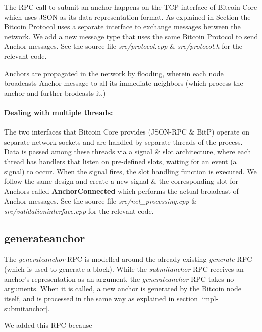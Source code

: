 The RPC call to submit an anchor happens on the TCP interface of Bitcoin Core which uses JSON as its data representation format. As explained in Section  the Bitcoin Protocol uses a separate interface to exchange messages between the network. 
We add a new message type that uses the same Bitcoin Protocol to send Anchor messages. 
See the source file \textit{src/protocol.cpp} \& \textit{src/protocol.h} for the relevant code.

Anchors are propagated in the network by flooding, wherein each node broadcasts Anchor message to all its immediate neighbors (which process the anchor and further brodcasts it.)


\paragraph{Dealing with multiple threads:} 
The two interfaces that Bitcoin Core provides (JSON-RPC \& BitP) operate on separate network sockets and are handled by separate threads of the process. 
Data is passed among these threads via a signal \& slot architecture, where each thread has handlers that listen on pre-defined slots, waiting for an event (a signal) to occur. When the signal fires, the slot handling function is executed.
We follow the same design and create a new signal \& the corresponding slot for Anchors called \textbf{AnchorConnected} which performs the actual broadcast of Anchor messages.
See the source file \textit{src/net\_processing.cpp} \& \textit{src/validationinterface.cpp} for the relevant code.


\subsection{generateanchor} \label{impl-generateanchor}

The \textit{generateanchor} RPC is modelled around the already existing \textit{generate} RPC (which is used to generate a block). 
While the \textit{submitanchor} RPC receives an anchor's representation as an argument, the \textit{generateanchor} RPC takes no arguments. When it is called, a new anchor is generated by the Bitcoin node itself, and is processed in the same way as explained in section \ref{impl-submitanchor}.

We added this RPC because 
